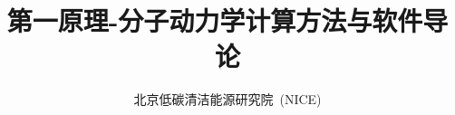 \title{第一原理-分子动力学计算方法与软件导论}   %
\renewcommand\Authfont{\small\rm } %
\renewcommand*{\Affilfont}{\small\it} %
\renewcommand\Authands{ , } %


\author{
\small
北京低碳清洁能源研究院~(NICE)
}
\date{}					%
\maketitle

